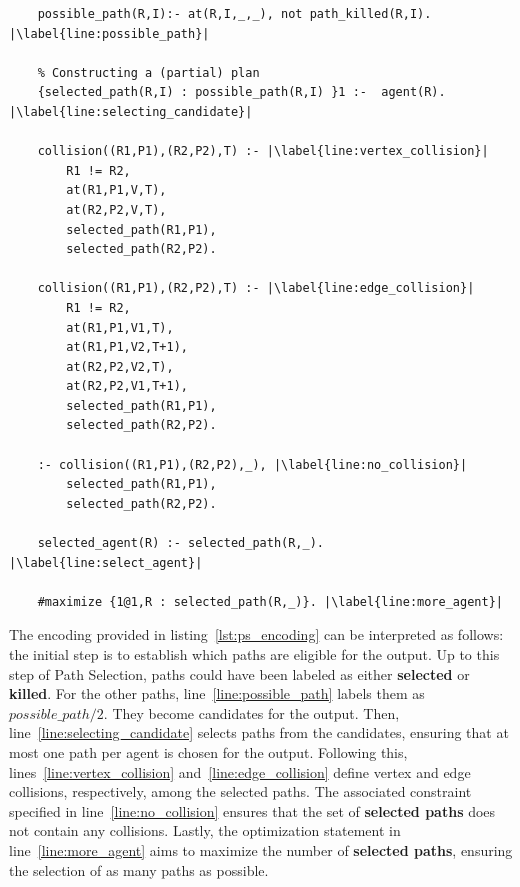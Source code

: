 \begin{minipage}[H]{\linewidth}
\begin{lstlisting}[style=mystyle, caption={Building a conflict free \(\tau'\)}, label={lst:ps_encoding}]
    % Defining collision & possible_path
    possible_path(R,I):- at(R,I,_,_), not path_killed(R,I). |\label{line:possible_path}|
    
    % Constructing a (partial) plan
    {selected_path(R,I) : possible_path(R,I) }1 :-  agent(R). |\label{line:selecting_candidate}|

    collision((R1,P1),(R2,P2),T) :- |\label{line:vertex_collision}|
        R1 != R2, 
        at(R1,P1,V,T), 
        at(R2,P2,V,T),
        selected_path(R1,P1),
        selected_path(R2,P2).

    collision((R1,P1),(R2,P2),T) :- |\label{line:edge_collision}|
        R1 != R2, 
        at(R1,P1,V1,T), 
        at(R1,P1,V2,T+1), 
        at(R2,P2,V2,T), 
        at(R2,P2,V1,T+1),
        selected_path(R1,P1),
        selected_path(R2,P2).
    
    :- collision((R1,P1),(R2,P2),_), |\label{line:no_collision}|
        selected_path(R1,P1), 
        selected_path(R2,P2).

    selected_agent(R) :- selected_path(R,_).  |\label{line:select_agent}|    

    #maximize {1@1,R : selected_path(R,_)}. |\label{line:more_agent}|
\end{lstlisting}
\end{minipage}

The encoding provided in listing~\ref{lst:ps_encoding} can be interpreted as follows: the initial step is to establish which paths are eligible for the output. Up to this step of Path Selection, paths could have been labeled as either \textbf{selected} or \textbf{killed}. For the other paths, line~\ref{line:possible_path} labels them as \(possible\_path/2\). They become candidates for the output. Then, line~\ref{line:selecting_candidate} selects paths from the candidates, ensuring that at most one path per agent is chosen for the output. Following this, lines~\ref{line:vertex_collision} and~\ref{line:edge_collision} define vertex and edge collisions, respectively, among the selected paths. The associated constraint specified in line~\ref{line:no_collision} ensures that the set of \textbf{selected paths} does not contain any collisions. Lastly, the optimization statement in line~\ref{line:more_agent} aims to maximize the number of \textbf{selected paths}, ensuring the selection of as many paths as possible.


